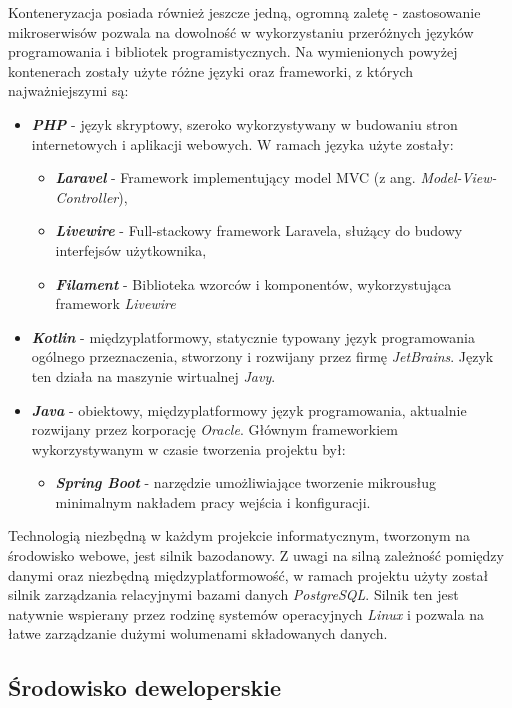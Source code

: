 Konteneryzacja posiada również jeszcze jedną, ogromną zaletę - zastosowanie mikroserwisów pozwala na dowolność w wykorzystaniu przeróżnych języków programowania i bibliotek programistycznych. Na wymienionych powyżej kontenerach zostały użyte różne języki oraz frameworki, z których najważniejszymi są:
\begin{itemize}
	\item \textbf{\textit{PHP}} - język skryptowy, szeroko wykorzystywany w budowaniu stron internetowych i aplikacji webowych. W ramach języka użyte zostały:
	\begin{itemize}
		\item \textbf{\textit{Laravel}} - Framework implementujący model MVC (z ang. \textit{Model-View-Controller}),
		\item \textbf{\textit{Livewire}} - Full-stackowy framework Laravela, służący do budowy interfejsów użytkownika,
		\item \textbf{\textit{Filament}} - Biblioteka wzorców i komponentów, wykorzystująca framework \textit{Livewire}
	\end{itemize}
	
	\item \textbf{\textit{Kotlin}} - międzyplatformowy, statycznie typowany język programowania ogólnego przeznaczenia, stworzony i rozwijany przez firmę \textit{JetBrains}. Język ten działa na maszynie wirtualnej \textit{Javy}. 
	
	\item \textbf{\textit{Java}} - obiektowy, międzyplatformowy język programowania, aktualnie rozwijany przez korporację \textit{Oracle}. Głównym frameworkiem wykorzystywanym w czasie tworzenia projektu był:
	\begin{itemize}
		\item \textbf{\textit{Spring Boot}} - narzędzie umożliwiające tworzenie mikrousług minimalnym nakładem pracy wejścia i konfiguracji.
	\end{itemize}
\end{itemize}

Technologią niezbędną w każdym projekcie informatycznym, tworzonym na środowisko webowe, jest silnik bazodanowy. Z uwagi na silną zależność pomiędzy danymi oraz niezbędną międzyplatformowość, w ramach projektu użyty został silnik zarządzania relacyjnymi bazami danych \textit{PostgreSQL}. Silnik ten jest natywnie wspierany przez rodzinę systemów operacyjnych \textit{Linux} i pozwala na łatwe zarządzanie dużymi wolumenami składowanych danych.

\subsection{Środowisko deweloperskie}

